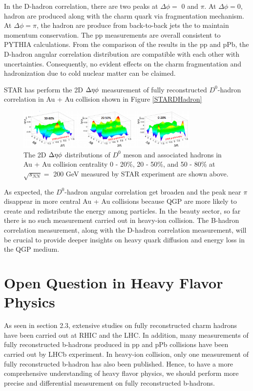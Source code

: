 In the D-hadron correlation, there are two peaks at $\Delta \phi =$ 0 and $\pi$. At $\Delta \phi = $0, hadron are produced along with the charm quark via fragmentation mechanism. At $\Delta \phi = \pi$, the hadron are produce from back-to-back jets the to maintain momentum conservation. The pp measurements are overall consistent to PYTHIA calculations. From the comparison of the results in the pp and pPb, the D-hadron angular correlation distribution are compatible with each other with uncertainties. Consequently, no evident effects on the
charm fragmentation and hadronization due to cold nuclear matter can be claimed. 

STAR has perform the 2D $\Delta \eta \time \Delta \phi$ measurement of fully reconstructed $D^0$-hadron correlation in Au + Au collision shown in Figure \ref{STARDHadron}

\begin{figure}[hbtp]
\begin{center}
\includegraphics[width=0.80\textwidth]{Figures/Chapter2/STARDHadron.png}
\caption{The 2D $\Delta \eta \time \Delta \phi$ distributions of $D^0$ meson and associated hadrons in Au + Au collision centrality 0 - 20\%, 20 - 50\%, and 50 - 80\% at $\sqrt{s_{NN}} = $ 200 GeV measured by STAR experiment are shown above.}
\label{ALICEDHadron}
\end{center}
\end{figure} 

As expected, the $D^0$-hadron angular correlation get broaden and the peak near $\pi$ disappear in more central Au + Au collisions because QGP are more likely to create and redistribute the energy among particles. In the beauty sector, so far there is no such measurement carried out in heavy-ion collision. The B-hadron correlation measurement, along with the D-hadron correlation measurement, will be crucial to provide deeper insights on heavy quark diffusion and energy loss in the QGP medium. 


\section{Open Question in Heavy Flavor Physics}

As seen in section 2.3, extensive studies on fully reconstructed charm hadrons have been carried out at RHIC and the LHC. In addition, many measurements of fully reconstructed b-hadrons produced in pp and pPb collisions have been carried out by LHCb experiment. In heavy-ion collision, only one measurement of fully reconstructed b-hadron has also been published. Hence, to have a more comprehensive understanding of heavy flavor physics, we should perform more precise and differential measurement on fully reconstructed b-hadrons. 

